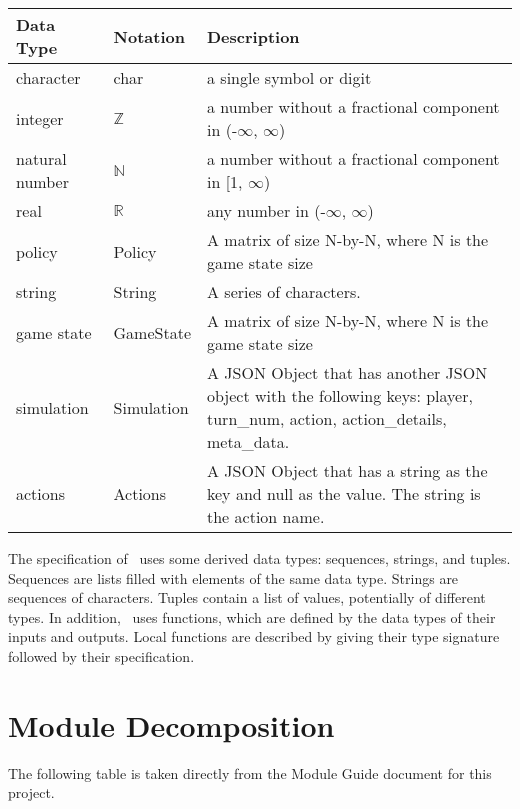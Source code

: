 \documentclass[12pt, titlepage]{article}
\begin{document}
\begin{center}
\renewcommand{\arraystretch}{1.2}
\noindent 
\begin{tabular}{l l p{7.5cm}} 
\toprule 
\textbf{Data Type} & \textbf{Notation} & \textbf{Description}\\ 
\midrule
character & char & a single symbol or digit\\
integer & $\mathbb{Z}$ & a number without a fractional component in (-$\infty$, $\infty$) \\
natural number & $\mathbb{N}$ & a number without a fractional component in [1, $\infty$) \\
real & $\mathbb{R}$ & any number in (-$\infty$, $\infty$)\\
policy & Policy & A matrix of size N-by-N, where N is the game state size \\
string & String & A series of characters.  \\
game state & GameState & A matrix of size N-by-N, where N is the game state size \\
simulation & Simulation & A JSON Object that has another JSON object with the following keys: player, turn_num, action, action_details, meta_data. \\
actions & Actions & A JSON Object that has a string as the key and null as the value. The string is the action name. \\
\bottomrule
\end{tabular} 
\end{center}

\noindent
The specification of \progname \ uses some derived data types: sequences, strings, and
tuples. Sequences are lists filled with elements of the same data type. Strings
are sequences of characters. Tuples contain a list of values, potentially of
different types. In addition, \progname \ uses functions, which
are defined by the data types of their inputs and outputs. Local functions are
described by giving their type signature followed by their specification.

\section{Module Decomposition}

The following table is taken directly from the Module Guide document for this project.
\end{document}

